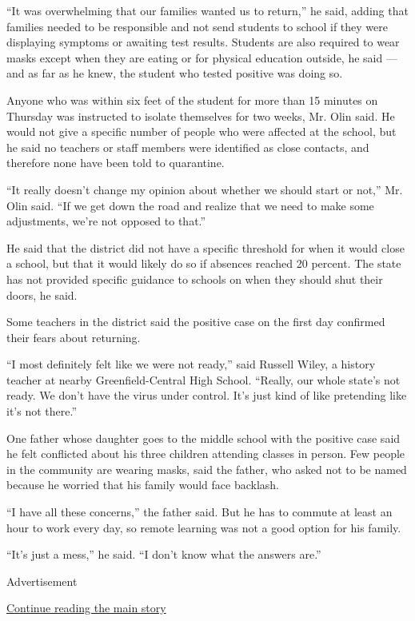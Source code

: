 ``It was overwhelming that our families wanted us to return,'' he said,
adding that families needed to be responsible and not send students to
school if they were displaying symptoms or awaiting test results.
Students are also required to wear masks except when they are eating or
for physical education outside, he said --- and as far as he knew, the
student who tested positive was doing so.

Anyone who was within six feet of the student for more than 15 minutes
on Thursday was instructed to isolate themselves for two weeks, Mr. Olin
said. He would not give a specific number of people who were affected at
the school, but he said no teachers or staff members were identified as
close contacts, and therefore none have been told to quarantine.

``It really doesn't change my opinion about whether we should start or
not,'' Mr. Olin said. ``If we get down the road and realize that we need
to make some adjustments, we're not opposed to that.''

He said that the district did not have a specific threshold for when it
would close a school, but that it would likely do so if absences reached
20 percent. The state has not provided specific guidance to schools on
when they should shut their doors, he said.

Some teachers in the district said the positive case on the first day
confirmed their fears about returning.

``I most definitely felt like we were not ready,'' said Russell Wiley, a
history teacher at nearby Greenfield-Central High School. ``Really, our
whole state's not ready. We don't have the virus under control. It's
just kind of like pretending like it's not there.''

One father whose daughter goes to the middle school with the positive
case said he felt conflicted about his three children attending classes
in person. Few people in the community are wearing masks, said the
father, who asked not to be named because he worried that his family
would face backlash.

``I have all these concerns,'' the father said. But he has to commute at
least an hour to work every day, so remote learning was not a good
option for his family.

``It's just a mess,'' he said. ``I don't know what the answers are.''

Advertisement

\protect\hyperlink{after-bottom}{Continue reading the main story}

